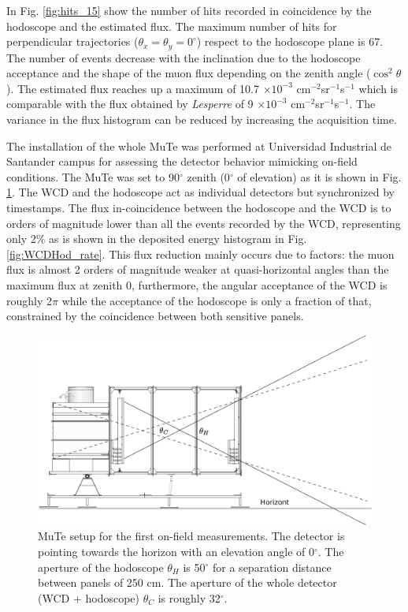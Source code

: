 \documentclass[letterpaper,11pt]{article}
\begin{document}
In Fig. \ref{fig:hits_15} show the number of hits recorded in coincidence by the hodoscope and the estimated flux. The maximum number of hits for perpendicular trajectories ($\theta_x=\theta_y=0^{\circ}$) respect to the hodoscope plane is 67. The number of events decrease with the inclination due to the hodoscope acceptance and the shape of the muon flux depending on the zenith angle ($\cos^2 \theta$). The estimated flux reaches up a maximum of 10.7 $\times 10^{-3}$ cm$^{-2}$sr$^{-1}$s$^{-1}$ which is comparable with the flux obtained by \textit{Lesperre} \cite{Lesparre2012} of 9 $\times 10^{-3}$ cm$^{-2}$sr$^{-1}$s$^{-1}$. The variance in the flux histogram can be reduced by increasing the acquisition time.



The installation of the whole MuTe was performed at Universidad Industrial de Santander campus for assessing the detector behavior mimicking on-field conditions. The MuTe was set to 90$^{\circ}$ zenith (0$^{\circ}$ of elevation) as it is shown in Fig. \ref{fig:WCDHod}. The WCD and the hodoscope act as individual detectors but synchronized by timestamps. The flux in-coincidence between the hodoscope and the WCD is to orders of magnitude lower than all the events recorded by the WCD, representing only 2$\%$ as is shown in the deposited energy histogram in Fig. \ref{fig:WCDHod_rate}. This flux reduction mainly occurs due to factors: the muon flux is almost 2 orders of magnitude weaker at quasi-horizontal angles than the maximum flux at zenith 0, furthermore, the angular acceptance of the WCD is roughly 2$\pi$ while the acceptance of the hodoscope is only a fraction of that, constrained by the coincidence between both sensitive panels.

\begin{figure}[htb]
\centering
\includegraphics[width=0.7\columnwidth]{Figures/Acceptance.eps}
\caption{MuTe setup for the first on-field measurements. The detector is pointing towards the horizon with an elevation angle of 0$^{\circ}$. The aperture of the hodoscope $\theta_H$ is 50$^{\circ}$ for a separation distance between panels of 250 cm. The aperture of the whole detector (WCD + hodoscope) $\theta_C$ is roughly 32$^{\circ}$.}
\label{fig:WCDHod}
\end{figure}
\end{document}
